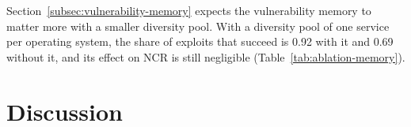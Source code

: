\documentclass{cshonours}
\begin{document}
Section~\ref{subsec:vulnerability-memory} expects the vulnerability memory to
matter more with a smaller diversity pool. With a diversity pool of one service
per operating system, the share of exploits that succeed is 0.92 with it and
0.69 without it, and its effect on NCR is still negligible
(Table~\ref{tab:ablation-memory}).

\chapter{Discussion}
\label{ch:discussion}

\end{document}
